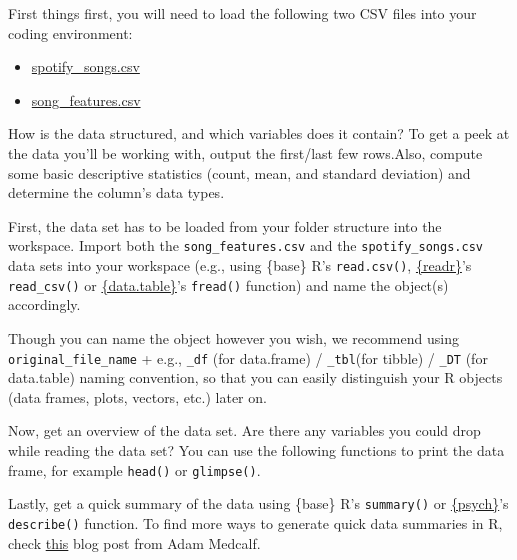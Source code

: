 \documentclass[
  11pt,
]{book}
\providecommand{\tightlist}{%
  \setlength{\itemsep}{0pt}\setlength{\parskip}{0pt}}
\newenvironment{tips}[1]
  {
  \begin{itemize}
  \footnotesize
  \renewcommand{\labelitemi}{
    \raisebox{-.7\height}[0pt][0pt]{
      {\setkeys{Gin}{width=3em,keepaspectratio}
        \texttt{[image: images/\#1.png]}}
    }
  }
  \setlength{\fboxsep}{1em}
  \begin{rbox}
  \item
  }
  {
  \end{rbox}
  \end{itemize}
  }
\begin{document}
First things first, you will need to load the following two CSV files into your coding environment:

\begin{itemize}
\tightlist
\item
  \href{https://drive.google.com/uc?export=download\&id=1OmFrdUaPFatpPLRikLJHS-VoF1F27G73}{spotify\_songs.csv}
\item
  \href{https://drive.google.com/uc?export=download\&id=1gHO566_qxBbz7t8fcH10uVQDAmxK33IF}{song\_features.csv}
\end{itemize}

How is the data structured, and which variables does it contain? To get a peek at the data you'll be working with, output the first/last few rows.Also, compute some basic descriptive statistics (count, mean, and standard deviation) and determine the column's data types.

\begin{tips}r

First, the data set has to be loaded from your folder structure into the workspace. Import both the \texttt{song\_features.csv} and the \texttt{spotify\_songs.csv} data sets into your workspace (e.g., using \{base\} R's \texttt{read.csv()}, \href{https://readr.tidyverse.org}{\{readr\}}'s \texttt{read\_csv()} or \href{https://rdatatable.gitlab.io/data.table/}{\{data.table\}}'s \texttt{fread()} function) and name the object(s) accordingly.

Though you can name the object however you wish, we recommend using \texttt{original\_file\_name} + e.g., \texttt{\_df} (for data.frame) / \texttt{\_tbl}(for tibble) / \texttt{\_DT} (for data.table) naming convention, so that you can easily distinguish your R objects (data frames, plots, vectors, etc.) later on.

Now, get an overview of the data set. Are there any variables you could drop while reading the data set? You can use the following functions to print the data frame, for example \texttt{head()} or \texttt{glimpse()}.

Lastly, get a quick summary of the data using \{base\} R's \texttt{summary()} or \href{https://personality-project.org/r/psych/}{\{psych\}}'s \texttt{describe()} function.
To find more ways to generate quick data summaries in R, check \href{https://dabblingwithdata.wordpress.com/2018/01/02/my-favourite-r-package-for-summarising-data/}{this} blog post from Adam Medcalf.

\end{tips}
\end{document}
